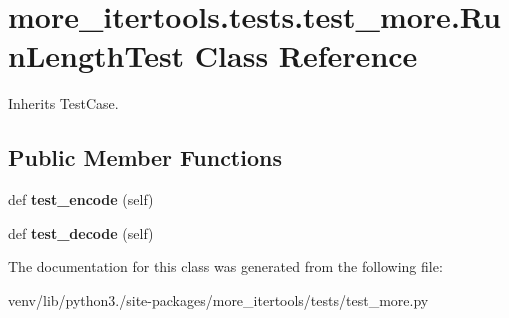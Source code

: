 \hypertarget{classmore__itertools_1_1tests_1_1test__more_1_1_run_length_test}{}\section{more\+\_\+itertools.\+tests.\+test\+\_\+more.\+Run\+Length\+Test Class Reference}
\label{classmore__itertools_1_1tests_1_1test__more_1_1_run_length_test}


Inherits Test\+Case.

\subsection*{Public Member Functions}
\begin{DoxyCompactItemize}
\item 
\mbox{\label{classmore__itertools_1_1tests_1_1test__more_1_1_run_length_test_a7cf303ad5705240e82d6374d5b926961}} 
def {\bfseries test\+\_\+encode} (self)
\item 
\mbox{\label{classmore__itertools_1_1tests_1_1test__more_1_1_run_length_test_afabf6611e929a993d4fbf2c5fe8dcb07}} 
def {\bfseries test\+\_\+decode} (self)
\end{DoxyCompactItemize}


The documentation for this class was generated from the following file\+:\begin{DoxyCompactItemize}
\item 
venv/lib/python3./site-\/packages/more\+\_\+itertools/tests/test\+\_\+more.\+py\end{DoxyCompactItemize}
